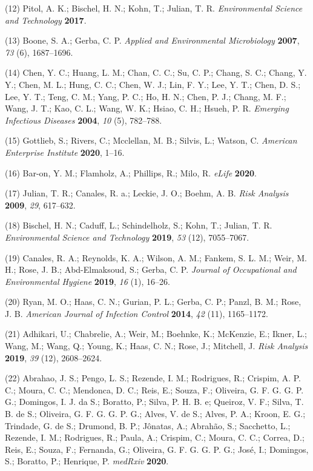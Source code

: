 \documentclass[journal=jacsat,manuscript=article]{achemso}
\begin{document}
\leavevmode\hypertarget{ref-Pitol2017}{}%
(12) Pitol, A. K.; Bischel, H. N.; Kohn, T.; Julian, T. R.
\emph{Environmental Science and Technology} \textbf{2017}.

\leavevmode\hypertarget{ref-Boone2007}{}%
(13) Boone, S. A.; Gerba, C. P. \emph{Applied and Environmental
Microbiology} \textbf{2007}, \emph{73} (6), 1687--1696.

\leavevmode\hypertarget{ref-Chen2004}{}%
(14) Chen, Y. C.; Huang, L. M.; Chan, C. C.; Su, C. P.; Chang, S. C.;
Chang, Y. Y.; Chen, M. L.; Hung, C. C.; Chen, W. J.; Lin, F. Y.; Lee, Y.
T.; Chen, D. S.; Lee, Y. T.; Teng, C. M.; Yang, P. C.; Ho, H. N.; Chen,
P. J.; Chang, M. F.; Wang, J. T.; Kao, C. L.; Wang, W. K.; Hsiao, C. H.;
Hsueh, P. R. \emph{Emerging Infectious Diseases} \textbf{2004},
\emph{10} (5), 782--788.

\leavevmode\hypertarget{ref-Mcclellan2020}{}%
(15) Gottlieb, S.; Rivers, C.; Mcclellan, M. B.; Silvis, L.; Watson, C.
\emph{American Enterprise Institute} \textbf{2020}, 1--16.

\leavevmode\hypertarget{ref-BarOn2020}{}%
(16) Bar-on, Y. M.; Flamholz, A.; Phillips, R.; Milo, R. \emph{eLife}
\textbf{2020}.

\leavevmode\hypertarget{ref-Julian2009}{}%
(17) Julian, T. R.; Canales, R. a.; Leckie, J. O.; Boehm, A. B.
\emph{Risk Analysis} \textbf{2009}, \emph{29}, 617--632.

\leavevmode\hypertarget{ref-Bischel2019}{}%
(18) Bischel, H. N.; Caduff, L.; Schindelholz, S.; Kohn, T.; Julian, T.
R. \emph{Environmental Science and Technology} \textbf{2019}, \emph{53}
(12), 7055--7067.

\leavevmode\hypertarget{ref-Canales2019}{}%
(19) Canales, R. A.; Reynolds, K. A.; Wilson, A. M.; Fankem, S. L. M.;
Weir, M. H.; Rose, J. B.; Abd-Elmaksoud, S.; Gerba, C. P. \emph{Journal
of Occupational and Environmental Hygiene} \textbf{2019}, \emph{16} (1),
16--26.

\leavevmode\hypertarget{ref-Ryan2014a}{}%
(20) Ryan, M. O.; Haas, C. N.; Gurian, P. L.; Gerba, C. P.; Panzl, B.
M.; Rose, J. B. \emph{American Journal of Infection Control}
\textbf{2014}, \emph{42} (11), 1165--1172.

\leavevmode\hypertarget{ref-Adhikari2019}{}%
(21) Adhikari, U.; Chabrelie, A.; Weir, M.; Boehnke, K.; McKenzie, E.;
Ikner, L.; Wang, M.; Wang, Q.; Young, K.; Haas, C. N.; Rose, J.;
Mitchell, J. \emph{Risk Analysis} \textbf{2019}, \emph{39} (12),
2608--2624.

\leavevmode\hypertarget{ref-Abrahao2020}{}%
(22) Abrahao, J. S.; Pengo, L. S.; Rezende, I. M.; Rodrigues, R.;
Crispim, A. P. C.; Moura, C. C.; Mendonca, D. C.; Reis, E.; Souza, F.;
Oliveira, G. F. G. G. P. G.; Domingos, I. J. da S.; Boratto, P.; Silva,
P. H. B. e; Queiroz, V. F.; Silva, T. B. de S.; Oliveira, G. F. G. G. P.
G.; Alves, V. de S.; Alves, P. A.; Kroon, E. G.; Trindade, G. de S.;
Drumond, B. P.; Jônatas, A.; Abrahão, S.; Sacchetto, L.; Rezende, I. M.;
Rodrigues, R.; Paula, A.; Crispim, C.; Moura, C. C.; Correa, D.; Reis,
E.; Souza, F.; Fernanda, G.; Oliveira, G. F. G. G. P. G.; José, I.;
Domingos, S.; Boratto, P.; Henrique, P. \emph{medRxiv} \textbf{2020}.
\end{document}

